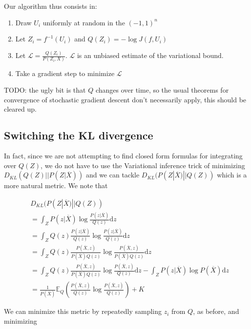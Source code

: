 \documentclass{article}
\begin{document}
Our algorithm thus consists in:

\begin{enumerate}
\item Draw \(U_i\) uniformly at random in the \((-1,1)^n\)
\item Let \(Z_i = f^{-1}(U_i)\) and \(Q(Z_i) = -\log J(f, U_i)\)
\item Let \(\mathcal{L} = \frac{Q(Z_i)}{P(Z_i, X)}\). \(\mathcal{L}\) is an
  unbiased estimate of the variational bound.
\item Take a gradient step to minimize \(\mathcal{L}\)
\end{enumerate}

TODO: the ugly bit is that \(Q\) changes over time, so the usual theorems for convergence
of stochastic gradient descent don't necessarily apply, this should be cleared up.

\subsection{Switching the KL divergence}

In fact, since we are not attempting to find closed form formulas for
integrating over \(Q(Z)\), we do not have to use the Variational inference
trick of minimizing \(D_{KL}(Q(Z)||P(Z|\overline{X}))\) and we can tackle
\(D_{KL}(P(Z|\overline{X})||Q(Z))\) which is a more natural metric. We note that

\[
\begin{aligned}
  & D_{KL}(P(Z|\overline{X})|| Q(Z)) \\
  &= \int_Z P(z|\overline{X}) \log \frac{P(z|\overline{X})}{Q(z)} \mathrm{d}z \\
  &= \int_Z Q(z) \frac{P(z|\overline{X})}{Q(z)} \log \frac{P(z|\overline{X})}{Q(z)}  \mathrm{d}z \\
  &= \int_Z Q(z) \frac{P(\overline{X}, z)}{P(\overline{X})Q(z)} \log \frac{P(\overline{X}, z)}{P(\overline{X})Q(z)}  \mathrm{d}z \\
  &= \int_Z Q(z) \frac{P(\overline{X}, z)}{P(\overline{X})Q(z)} \log \frac{P(\overline{X}, z)}{Q(z)}  \mathrm{d}z
  - \int_Z P(z|\overline{X}) \log P(\overline{X})  \mathrm{d}z \\
  &= \frac{1}{P(\overline{X})}\mathbb{E}_{Q} \left( \frac{P(\overline{X}, z)}{Q(z)} \log \frac{P(\overline{X}, z)}{Q(z)}\right) + K
\end{aligned}
\]

We can minimize this metric by repeatedly sampling \(z_i\) from \(Q\),
as before, and minimizing
\end{document}
